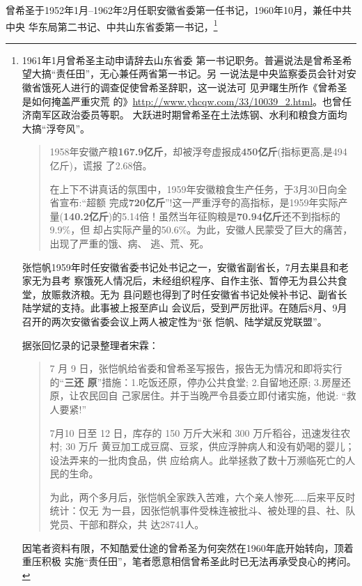 曾希圣于1952年1月--1962年2月任职安徽省委第一任书记，1960年10月，兼任中共中央
华东局第二书记、中共山东省委第一书记，\footnote{1961年1月曾希圣主动申请辞去山东省委
  第一书记职务。普遍说法是曾希圣希望大搞“责任田”，无心兼任两省第一书记。另
  一说法是中央监察委员会针对安徽省饿死人进行的调查促使曾希圣辞职，这一说法可
  见尹曙生所作《曾希圣是如何掩盖严重灾荒
  的》\url{http://www.yhcqw.com/33/10039_2.html}。也曾任济南军区政治委员等职。
  大跃进时期曾希圣在土法炼钢、水利和粮食方面均大搞“浮夸风”。

\begin{quotation}
  1958年安徽产粮\textbf{167.9亿斤}，却被浮夸虚报成\textbf{450亿斤}(指标更高,是494亿斤)，谎报
  了2.68倍。\cite{zhangfandang}

  在上下不讲真话的氛围中，1959年安徽粮食生产任务，于3月30日向全省宣布:“超额
  完成\textbf{720亿斤}”!这一严重浮夸的高指标，是1959年实际产
  量(\textbf{140.2亿斤})的5.14倍！虽然当年征购粮是\textbf{70.94亿斤}还不到指标的9.9\%，但
  却占实际产量的50.6\%。为此，安徽人民蒙受了巨大的痛苦，出现了严重的饿、病、
  逃、荒、死。\cite{zhang1959}
\end{quotation}

张恺帆1959年时任安徽省委书记处书记之一，安徽省副省长，7月去巣县和老家无为县考
察饿死人情况后，未经组织程序、自作主张、暂停无为县公共食堂，放赈救济粮。无为
县问题也得到了时任安徽省书记处候补书记、副省长陆学斌的支持。此事被上报至庐山
会议后，受到严厉批评。在随后8月、9月召开的两次安徽省委会议上两人被定性为“张
恺帆、陆学斌反党联盟”。

据张回忆录的记录整理者宋霖：
\begin{quotation}
  7 月 9 日，张恺帆给省委和曾希圣写报告，报告无为情况和即将实行的“\textbf{三还
    原}”措施：1.吃饭还原，停办公共食堂; 2.自留地还原; 3.房屋还原，让农民回自
  己家居住。并于当晚严令县委立即付诸实施，他说: “救人要紧!”

  7月10 日至 12 日，库存的 150 万斤大米和 300 万斤稻谷，迅速发往农村; 30 万斤
  黄豆加工成豆腐、豆浆，供应浮肿病人和没有奶喝的婴儿；设法弄来的一批肉食品，供
  应给病人。此举拯救了数十万濒临死亡的人民的生命。

  为此，两个多月后，张恺帆全家跌入苦难，六个亲人惨死……后来平反时统计：仅无
  为一县，因张恺帆事件受株连被批斗、被处理的县、社、队党员、干部和群众，共
  达28741人。\cite{zhang1959}
\end{quotation}

因笔者资料有限，不知酷爱仕途的曾希圣为何突然在1960年底开始转向，顶着重压积极
实施“责任田”，笔者愿意相信曾希圣此时已无法再承受良心的拷问。

}
